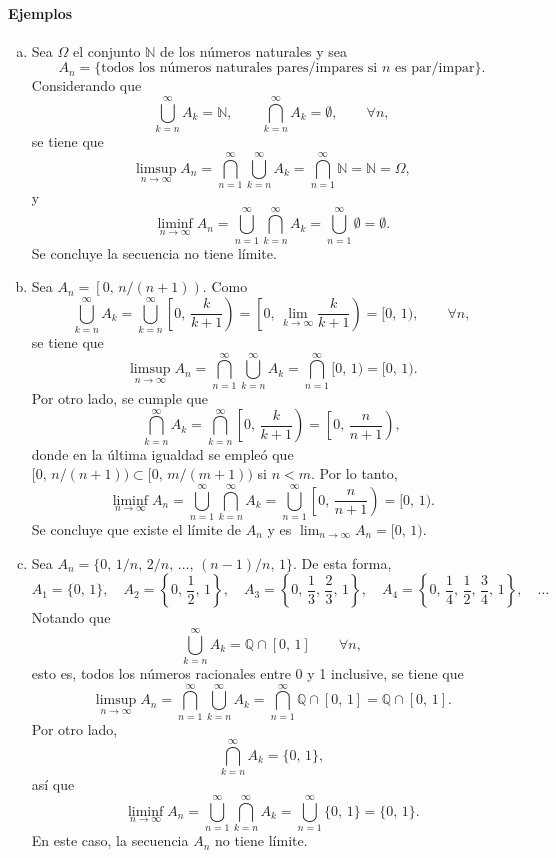 \documentclass[a4paper]{report}
\begin{document}
\paragraph{Ejemplos}
\begin{enumerate}[(a)]
 \item Sea \(\Omega\) el conjunto \(\mathbb{N}\) de los números naturales y sea
\[
 A_n=\{\textrm{todos los números naturales pares/impares si }n\textrm{ es par/impar}\}. 
\]
Considerando que 
\[
 \bigcup_{k=n}^{\infty }A_k=\mathbb{N},\qquad \bigcap_{k=n}^{\infty }A_k=\emptyset,\qquad \forall n,
\]
se tiene que
\[
 \limsup_{n\rightarrow \infty }A_n=\bigcap_{n=1}^{\infty }\bigcup_{k=n}^{\infty }A_k=\bigcap_{n=1}^{\infty }\mathbb{N}=\mathbb{N}=\Omega,
\]
y
\[
 \liminf_{n\rightarrow \infty }A_n=\bigcup_{n=1}^{\infty }\bigcap_{k=n}^{\infty }A_k=\bigcup_{n=1}^{\infty }\emptyset=\emptyset.
\]
Se concluye la secuencia no tiene límite.
\item Sea \(A_n=\left[0,\,n/(n+1)\right)\). Como
\[
 \bigcup_{k=n}^{\infty }A_k=\bigcup_{k=n}^{\infty }\left[0,\,\frac{k}{k+1}\right)=\left[0,\,\lim_{k\to\infty}\frac{k}{k+1}\right)=[0,\,1),\qquad\forall n,
\]
se tiene que
\[
 \limsup_{n\rightarrow \infty }A_n=\bigcap_{n=1}^{\infty }\bigcup_{k=n}^{\infty }A_k=\bigcap_{n=1}^{\infty }[0,\,1)=[0,\,1).
\]
Por otro lado, se cumple que
\[
 \bigcap_{k=n}^{\infty }A_k=\bigcap_{k=n}^{\infty }\left[0,\,\frac{k}{k+1}\right)=\left[0,\,\frac{n}{n+1}\right),
\]
 donde en la última igualdad se empleó que \([0,\,n/(n+1))\subset[0,\,m/(m+1))\) si \(n<m\). Por lo tanto,
 \[
 \liminf_{n\rightarrow \infty }A_n=\bigcup_{n=1}^{\infty }\bigcap_{k=n}^{\infty }A_k=\bigcup_{n=1}^{\infty }\left[0,\,\frac{n}{n+1}\right)=[0,\,1).
\]
 Se concluye que existe el límite de \(A_n\) y es \(\lim_{n\to\infty}A_n=[0,\,1)\). 
 
 \item Sea \(A_n = \{0,\,1/n,\,2/n,\,...,\,(n-1)/n,\,1\}\). De esta forma,
 \[
  A_1 = \{0,\,1\},\quad A_2 = \left\{0,\,\frac{1}{2},\,1\right\},\quad A_3 = \left\{0,\,\frac{1}{3},\,\frac{2}{3},\,1\right\},\quad A_4 = \left\{0,\,\frac{1}{4},\,\frac{1}{2},\,\frac{3}{4},\,1\right\},\quad\dots
 \]
 Notando que
\[
 \bigcup_{k=n}^{\infty }A_k=\mathbb{Q}\cap[0,\,1] \qquad\forall n,
\]
 esto es, todos los números racionales entre 0 y 1 inclusive, se tiene que
\[
 \limsup_{n\rightarrow \infty }A_n=\bigcap_{n=1}^{\infty }\bigcup_{k=n}^{\infty }A_k=\bigcap_{n=1}^{\infty }\mathbb{Q}\cap[0,\,1]=\mathbb{Q}\cap[0,\,1].
\]
Por otro lado,
\[
 \bigcap_{k=n}^{\infty }A_k=\{0,\,1\},
\]
así que
 \[
 \liminf_{n\rightarrow \infty }A_n=\bigcup_{n=1}^{\infty }\bigcap_{k=n}^{\infty }A_k=\bigcup_{n=1}^{\infty }\{0,\,1\}=\{0,\,1\}.
\]
En este caso, la secuencia \(A_n\) no tiene límite.
\end{enumerate}
\end{document}
